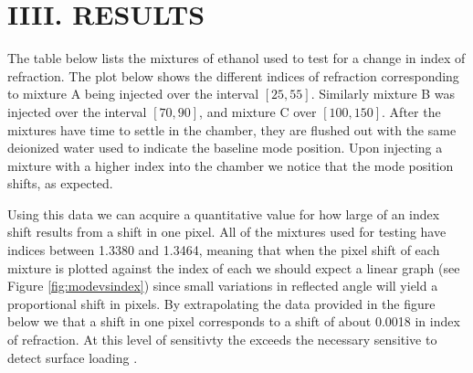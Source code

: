 \section*{IIII. RESULTS}
\label{sec:results}
\hspace{0.25in}
The table below lists the mixtures of ethanol used to test for a change in index of refraction. The plot below shows the different indices of refraction corresponding to mixture A being injected over the interval $[25, 55]$. Similarly mixture B was injected over the interval $[70, 90]$, and mixture C over $[100, 150]$. After the mixtures have time to settle in the chamber, they are flushed out with the same deionized water used to indicate the baseline mode position. Upon injecting a mixture with a higher index into the chamber we notice that the mode position shifts, as expected. 


\hspace{0.1in}
Using this data we can acquire a quantitative value for how large of an index shift results from a shift in one pixel. All of the mixtures used for testing have indices between 1.3380 and 1.3464, meaning that when the pixel shift of each mixture is plotted against the index of each we should expect a linear graph (see Figure \ref{fig:modevsindex}) since small variations in reflected angle will yield a proportional shift in pixels.
By extrapolating the data provided in the figure below we that a shift in one pixel corresponds to a shift of about 0.0018 in index of refraction. At this level of sensitivty the exceeds the necessary sensitive to detect surface loading \cite{roberstonpaper}.

